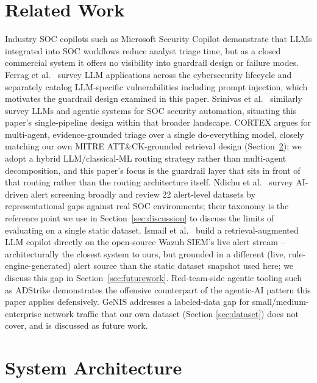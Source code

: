 \documentclass[conference]{IEEEtran}
\begin{document}
\section{Related Work}

Industry SOC copilots such as Microsoft Security Copilot \cite{msseccopilot2024} demonstrate that
LLMs integrated into SOC workflows reduce analyst triage time, but as a closed commercial system
it offers no visibility into guardrail design or failure modes. Ferrag et al.\
\cite{ferrag2024genai} survey LLM applications across the cybersecurity lifecycle and separately
catalog LLM-specific vulnerabilities including prompt injection, which motivates the guardrail
design examined in this paper. Srinivas et al.\ \cite{socaugsurvey2025} similarly survey LLMs and
agentic systems for SOC security automation, situating this paper's single-pipeline design within
that broader landscape. CORTEX \cite{cortex2025} argues for multi-agent, evidence-grounded
triage over a single do-everything model, closely matching our own MITRE ATT\&CK-grounded
retrieval design (Section~\ref{sec:architecture}); we adopt a hybrid LLM/classical-ML routing
strategy rather than multi-agent decomposition, and this paper's focus is the guardrail layer
that sits in front of that routing rather than the routing architecture itself. Ndichu et al.\
\cite{ndichu2026survey} survey AI-driven alert screening broadly and review 22 alert-level
datasets by representational gaps against real SOC environments; their taxonomy is the reference
point we use in Section~\ref{sec:discussion} to discuss the limits of evaluating on a single
static dataset. Ismail et al.\ \cite{wazuh2025rag} build a retrieval-augmented LLM copilot
directly on the open-source Wazuh SIEM's live alert stream -- architecturally the closest system
to ours, but grounded in a different (live, rule-engine-generated) alert source than the static
dataset snapshot used here; we discuss this gap in Section~\ref{sec:futurework}. Red-team-side
agentic tooling such as ADStrike \cite{adstrike2025} demonstrates the offensive counterpart of
the agentic-AI pattern this paper applies defensively. GeNIS \cite{genis2025} addresses a
labeled-data gap for small/medium-enterprise network traffic that our own dataset (Section
\ref{sec:dataset}) does not cover, and is discussed as future work.

\section{System Architecture}
\label{sec:architecture}
\end{document}
